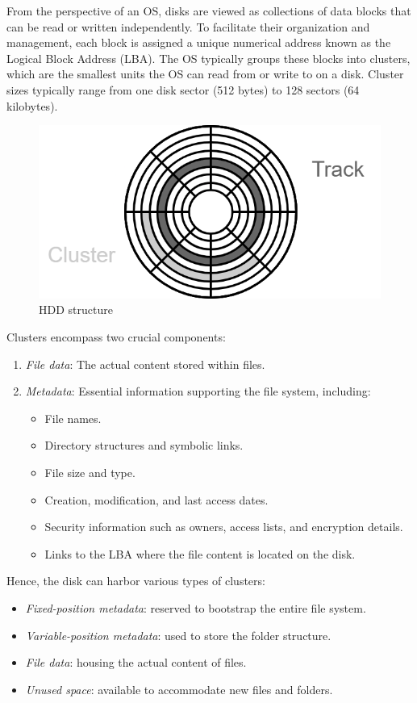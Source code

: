 From the perspective of an OS, disks are viewed as collections of data blocks that can be read or written independently.
To facilitate their organization and management, each block is assigned a unique numerical address known as the Logical Block Address (LBA). 
The OS typically groups these blocks into clusters, which are the smallest units the OS can read from or write to on a disk.
Cluster sizes typically range from one disk sector (512 bytes) to 128 sectors (64 kilobytes).
\begin{figure}[H]
    \centering
    \includegraphics[width=0.5\linewidth]{images/hdd.png}
    \caption{HDD structure}
\end{figure}
Clusters encompass two crucial components:
\begin{enumerate}
    \item \textit{File data}: The actual content stored within files.
    \item \textit{Metadata}: Essential information supporting the file system, including:
        \begin{itemize}
            \item File names.
            \item Directory structures and symbolic links.
            \item File size and type.
            \item Creation, modification, and last access dates.
            \item Security information such as owners, access lists, and encryption details.
            \item Links to the LBA where the file content is located on the disk.
        \end{itemize}
\end{enumerate}
Hence, the disk can harbor various types of clusters:
\begin{itemize}
    \item \textit{Fixed-position metadata}: reserved to bootstrap the entire file system.
    \item \textit{Variable-position metadata}: used to store the folder structure.
    \item \textit{File data}: housing the actual content of files.
    \item \textit{Unused space}: available to accommodate new files and folders.
\end{itemize}


